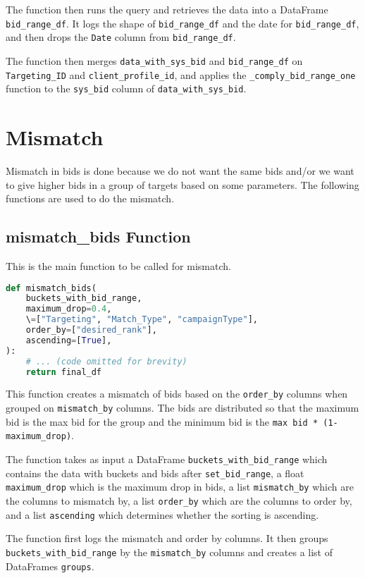 The function then runs the query and retrieves the data into a DataFrame \verb|bid_range_df|. It logs the shape of \verb|bid_range_df| and the date for \verb|bid_range_df|, and then drops the \verb|Date| column from \verb|bid_range_df|.

The function then merges \verb|data_with_sys_bid| and \verb|bid_range_df| on \verb|Targeting_ID| and \verb|client_profile_id|, and applies the \verb|_comply_bid_range_one| function to the \verb|sys_bid| column of \verb|data_with_sys_bid|.

\section{Mismatch}

Mismatch in bids is done because we do not want the same bids and/or we want to give higher bids in a group of targets based on some parameters. The following functions are used to do the mismatch.

\subsection{mismatch\_bids Function}
This is the main function to be called for mismatch.

\begin{lstlisting}[language=Python]
def mismatch_bids(
    buckets_with_bid_range,
    maximum_drop=0.4,
    \=["Targeting", "Match_Type", "campaignType"],
    order_by=["desired_rank"],
    ascending=[True],
):
    # ... (code omitted for brevity)
    return final_df
\end{lstlisting}

This function creates a mismatch of bids based on the \verb|order_by| columns when grouped on \verb|mismatch_by| columns. The bids are distributed so that the maximum bid is the max bid for the group and the minimum bid is the \verb|max bid * (1-maximum_drop)|.

The function takes as input a DataFrame \verb|buckets_with_bid_range| which contains the data with buckets and bids after \verb|set_bid_range|, a float \verb|maximum_drop| which is the maximum drop in bids, a list \verb|mismatch_by| which are the columns to mismatch by, a list \verb|order_by| which are the columns to order by, and a list \verb|ascending| which determines whether the sorting is ascending.

The function first logs the mismatch and order by columns. It then groups \verb|buckets_with_bid_range| by the \verb|mismatch_by| columns and creates a list of DataFrames \verb|groups|.

